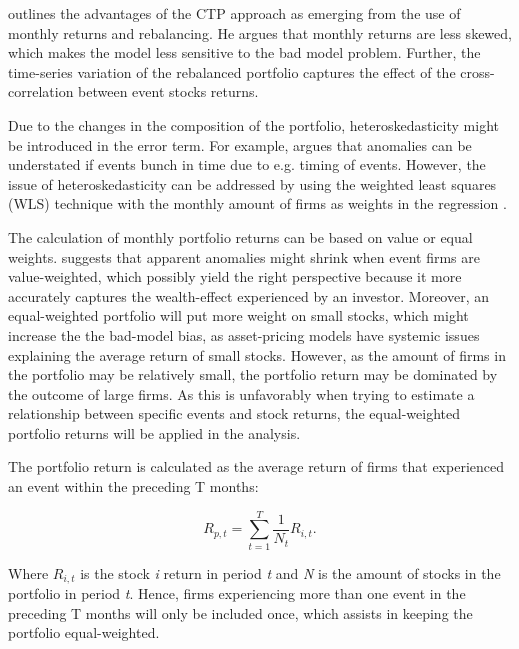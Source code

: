 \cite{fama1998_events} outlines the advantages of the CTP approach as emerging from the use of monthly returns and rebalancing. He argues that monthly returns are less skewed, which makes the model less sensitive to the bad model problem. Further, the time-series variation of the rebalanced portfolio captures the effect of the cross-correlation between event stocks returns. 

Due to the changes in the composition of the portfolio, heteroskedasticity might be introduced in the error term. For example, \cite{ritter1995} argues that anomalies can be understated if events bunch in time due to e.g. timing of events. However, the issue of heteroskedasticity can be addressed by using the weighted least squares (WLS) technique with the monthly amount of firms as weights in the regression \citep{Ang_event_method}.

The calculation of monthly portfolio returns can be based on value or equal weights. \cite{fama1998_events} suggests that apparent anomalies might shrink when event firms are value-weighted, which possibly yield the right perspective because it more accurately captures the wealth-effect experienced by an investor. Moreover, an equal-weighted portfolio will put more weight on small stocks, which might increase the the bad-model bias, as asset-pricing models have systemic issues explaining the average return of small stocks. However, as the amount of firms in the portfolio may be relatively small, the portfolio return may be dominated by the outcome of large firms. As this is unfavorably when trying to estimate a relationship between specific events and stock returns, the equal-weighted portfolio returns will be applied in the analysis. 

The portfolio return is calculated as the average return of firms that experienced an event within the preceding T months:

\begin{equation}
    R_{p,t} = \sum_{t = 1} ^{T} \frac{1}{N_t} R_{i,t}.
\end{equation}

Where $R_{i,t}$ is the stock \textit{i} return in period \textit{t} and \textit{N} is the amount of stocks in the portfolio in period \textit{t}. Hence, firms experiencing more than one event in the preceding T months will only be included once, which assists in keeping the portfolio equal-weighted. 

